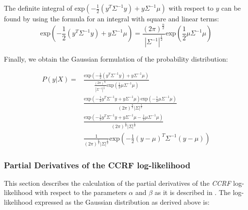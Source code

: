The definite integral of $\text{exp}(- \frac{1}{2}(y^T\Sigma^{-1}y)+y\Sigma^{-1}\mu)$ with respect to $y$ can be found by using the formula for an integral with square and linear terms:
\begin{equation}
\text{exp}(- \frac{1}{2}(y^T\Sigma^{-1}y)+y\Sigma^{-1}\mu) = \frac{(2\pi)^{\frac{n}{2}}}{|\Sigma^{-1}|^{\frac{1}{2}}}\text{exp}(\frac{1}{2}\mu \Sigma^{-1} \mu)
\end{equation}

Finally, we obtain the Gaussian formulation of the probability distribution:

\begin{equation}
\begin{split}
P(y|X) = & \frac{\text{exp}(- \frac{1}{2}(y^T\Sigma^{-1}y)+y\Sigma^{-1}\mu)}{\frac{(2\pi)^{\frac{n}{2}}}{|\Sigma^{-1}|^{\frac{1}{2}}}\text{exp}(\frac{1}{2}\mu \Sigma^{-1} \mu)}\\
& \frac{\text{exp}( - \frac{1}{2} y^T \Sigma^{-1} y + y\Sigma^{-1}\mu )\text{exp} (-\frac{1}{2}\mu\Sigma^{-1}\mu) }{ (2\pi)^{\frac{n}{2}} |\Sigma|^{\frac{1}{2}} } \\
& \frac{\text{exp}(-\frac{1}{2} y^T \Sigma^{-1} y + y \Sigma^{-1} \mu - \frac{1}{2} \mu \Sigma^{-1} \mu)   }{  (2\pi)^{\frac{n}{2}} |\Sigma|^{\frac{1}{2}} } \\
& \frac{1}{   (2\pi)^{\frac{n}{2}} |\Sigma|^{\frac{1}{2}} }\text{exp}(-\frac{1}{2} (y-\mu)^T \Sigma^{-1} (y-\mu))
\end{split}
\end{equation}

\subsubsection{Partial Derivatives of the CCRF log-likelihood}

This section describes the calculation of the partial derivatives of the \textit{CCRF} log-likelihood with respect to the parameters $\alpha$ and $\beta$ as it is described in \cite{baltruvsaitis2013dimensional}.
The log-likelihood expressed as the Gaussian distribution as derived above is:

